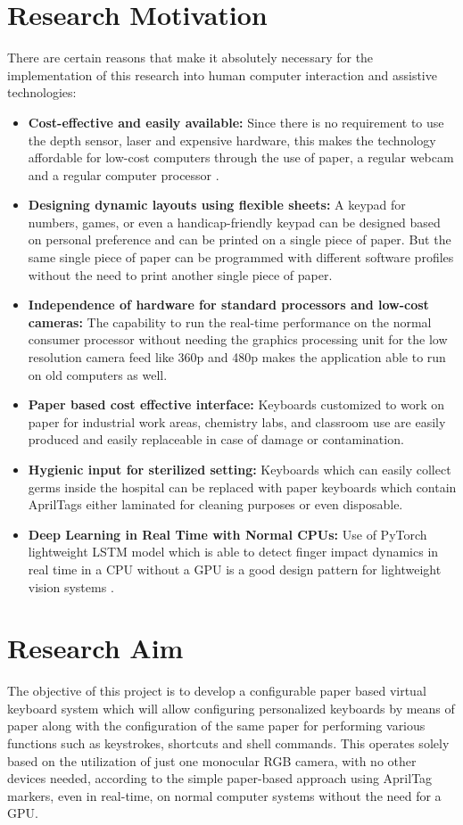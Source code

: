 \section{Research Motivation}
\label{sec:research_motivation}
There are certain reasons that make it absolutely necessary for the implementation of this research into human computer interaction and assistive technologies:
\begin{itemize}
    \item \textbf{Cost-effective and easily available:} Since there is no requirement to use the depth sensor, laser and expensive hardware, this makes the technology affordable for low-cost computers through the use of paper, a regular webcam and a regular computer processor \cite{Khare2019QWERTY, Sreenath2021Monocular}.
    \item \textbf{Designing dynamic layouts using flexible sheets:} A keypad for numbers, games, or even a handicap-friendly keypad can be designed based on personal preference and can be printed on a single piece of paper. But the same single piece of paper can be programmed with different software profiles without the need to print another single piece of paper.
    \item \textbf{Independence of hardware for standard processors and low-cost cameras:} The capability to run the real-time performance on the normal consumer processor without needing the graphics processing unit for the low resolution camera feed like 360p and 480p makes the application able to run on old computers as well.
    \item \textbf{Paper based cost effective interface:} Keyboards customized to work on paper for industrial work areas, chemistry labs, and classroom use are easily produced and easily replaceable in case of damage or contamination.
    \item \textbf{Hygienic input for sterilized setting:} Keyboards which can easily collect germs inside the hospital can be replaced with paper keyboards which contain AprilTags either laminated for cleaning purposes or even disposable.
    \item \textbf{Deep Learning in Real Time with Normal CPUs:} Use of PyTorch lightweight LSTM model which is able to detect finger impact dynamics in real time in a CPU without a GPU is a good design pattern for lightweight vision systems \cite{Hochreiter1997LSTM, Zhang2020MediaPipe, GilMartin2023Hand, Gammulle2021TMMF}.
\end{itemize}

\section{Research Aim}
\label{sec:research_aim}
The objective of this project is to develop a configurable paper based virtual keyboard system which will allow configuring personalized keyboards by means of paper along with the configuration of the same paper for performing various functions such as keystrokes, shortcuts and shell commands. This operates solely based on the utilization of just one monocular RGB camera, with no other devices needed, according to the simple paper-based approach using AprilTag markers, even in real-time, on normal computer systems without the need for a GPU.

